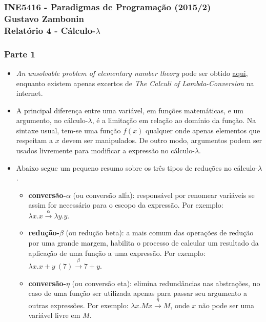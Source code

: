 \documentclass{article}
\begin{document}
\subsubsection*{INE5416 - Paradigmas de Programação (2015/2) \\
    Gustavo Zambonin \\
    Relatório 4 - Cálculo-$\lambda$
}

\subsubsection*{Parte 1}
\begin{itemize}
    \item \textit{An unsolvable problem of elementary number theory} pode ser
    obtido
    \href{http://www.ics.uci.edu/~lopes/teaching/inf212W12/readings/church.pdf}
    {aqui}, enquanto existem apenas excertos de \textit{The Calculi of
    Lambda-Conversion} na internet.

    \item A principal diferença entre uma variável, em funções matemáticas, e um
    argumento, no cálculo-$\lambda$, é a limitação em relação ao domínio da
    função. Na sintaxe usual, tem-se uma função $f(x)$ qualquer onde apenas
    elementos que respeitam a $x$ devem ser manipulados. De outro modo,
    argumentos podem ser usados livremente para modificar a expressão no
    cálculo-$\lambda$.

    \item Abaixo segue um pequeno resumo sobre os três tipos de reduções no
    cálculo-$\lambda$.
    \begin{itemize}
        \item \textbf{conversão-$\alpha$} (ou conversão alfa): responsável por
        renomear variáveis se assim for necessário para o escopo da expressão.
        Por exemplo: $\lambda x.x \stackrel{\alpha}{\rightarrow} \lambda y.y$.

        \item \textbf{redução-$\beta$} (ou redução beta): a mais comum das
        operações de redução por uma grande margem, habilita o processo de
        calcular um resultado da aplicação de uma função a uma expressão. Por
        exemplo: $\lambda x.x + y\ (7) \stackrel{\beta}{\rightarrow} 7 + y$.

        \item \textbf{conversão-$\eta$} (ou conversão eta): elimina redundâncias
        nas abstrações, no caso de uma função ser utilizada apenas para passar
        seu argumento a outras expressões. Por exemplo: $\lambda x.Mx
        \stackrel{\eta}{\rightarrow} M$, onde $x$ não pode ser uma variável
        livre em $M$.
    \end{itemize}
\end{itemize}
\end{document}
